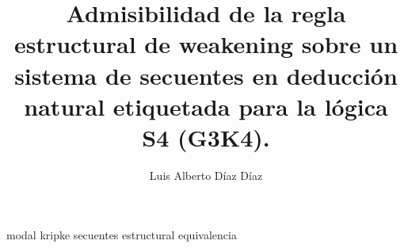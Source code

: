 \documentclass[12pt,twoside,a4paper]{report}
\begin{document}
\title{Admisibilidad de la regla estructural de weakening sobre un sistema de secuentes en deducción natural etiquetada para la lógica S4 (G3K4).}

\author{Luis Alberto Díaz Díaz}

\maketitle


{modal}
{kripke}
{secuentes}
{estructural}
{equivalencia}
\end{document}
